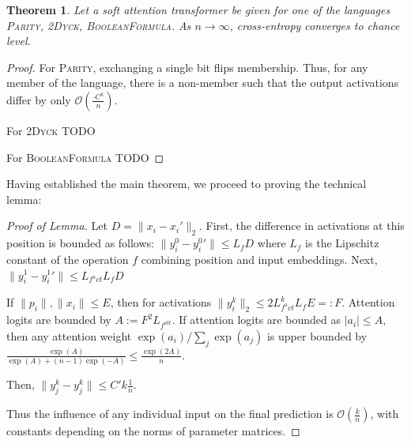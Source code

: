 \documentclass[11pt,a4paper]{article}
\newcounter{theorem}
\newtheorem{thm}[theorem]{Theorem}
\begin{document}
\begin{thm}
Let a soft attention transformer be given for one of the languages \textsc{Parity}, \textsc{2Dyck}, \textsc{BooleanFormula}.
As $n\rightarrow\infty$, cross-entropy converges to chance level.
\end{thm}

\begin{proof}
For \textsc{Parity}, exchanging a single bit flips membership.
Thus, for any member of the language, there is a non-member such that the output activations differ by
only $\mathcal{O}(\frac{\cdot C^k}{n})$.

For \textsc{2Dyck} TODO

For \textsc{BooleanFormula} TODO


\end{proof}

Having established the main theorem, we proceed to proving the technical lemma:
\begin{proof}[Proof of Lemma]
Let $D = \|x_i-x_i'\|_2$.
First, the difference in activations at this position is bounded as follows:
$\|y_i^0 - {y_i^0}'\| \leq L_f D$
where $L_f$ is the Lipschitz constant of the operation $f$ combining position and input embeddings.
Next, $\|y_i^1 - {y_i^1}'\| \leq L_{f^act} L_f D$

If $\|p_i\|, \|x_i\| \leq E$, then for activations $\|y_i^k\|_2 \leq 2 L_{f^act}^k L_f E =: F$.
Attention logits are bounded by $A := F^2 L_{f^{att}}$.
If attention logits are bounded as $|a_i| \leq A$,
then any attention weight $\exp(a_i)/\sum_j \exp(a_j)$ is upper bounded by $\frac{\exp(A)}{\exp(A) + (n-1) \exp(-A)} \leq \frac{\exp(2A)}{n}$.

Then, $\|y_j^k - {y_j^k}\| \leq C' k \frac{1}{n}$.

Thus the influence of any individual input on the final prediction is $\mathcal{O}(\frac{k}{n})$, with constants depending on the norms of parameter matrices.
\end{proof}


\end{document}
